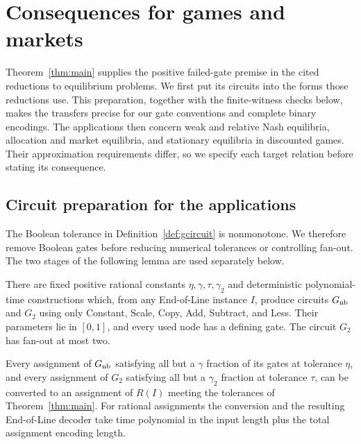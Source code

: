 \section{Consequences for games and markets}\label{sec:weak-nash}

Theorem~\ref{thm:main} supplies the positive failed-gate premise in
the cited reductions to equilibrium problems. We first put its
circuits into the forms those reductions use. This preparation, together
with the finite-witness checks below, makes the transfers precise for
our gate conventions and complete binary encodings. The applications
then concern weak and relative Nash equilibria, allocation and market
equilibria, and stationary equilibria in discounted games. Their
approximation requirements differ, so we specify each target relation
before stating its consequence.

\subsection{Circuit preparation for the applications}

The Boolean tolerance in Definition~\ref{def:gcircuit} is nonmonotone.
We therefore remove Boolean gates before reducing numerical tolerances
or controlling fan-out. The two stages of the following lemma are used
separately below.

\begin{lemma}\label{lem:application-circuits}
There are fixed positive rational constants $\eta,\gamma,\tau,\gamma_2$
and deterministic polynomial-time constructions which, from any
End-of-Line instance $I$, produce circuits $G_{\rm nb}$ and $G_2$
using only Constant, Scale, Copy, Add, Subtract, and Less. Their parameters
lie in $[0,1]$, and every used node has a defining gate. The circuit
$G_2$ has fan-out at most two.

Every assignment of $G_{\rm nb}$ satisfying all but a $\gamma$
fraction of its gates at tolerance $\eta$, and every assignment of
$G_2$ satisfying all but a $\gamma_2$ fraction at tolerance $\tau$,
can be converted to an assignment of $R(I)$ meeting the tolerances of
Theorem~\ref{thm:main}. For rational assignments the conversion and the
resulting End-of-Line decoder take time polynomial in the input length
plus the total assignment encoding length.
\end{lemma}


